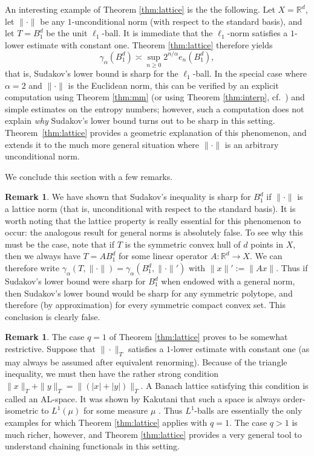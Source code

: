 \documentclass[10pt,reqno]{amsart}
\theoremstyle{definition}
\newtheorem{rem}[thm]{Remark}
\numberwithin{equation}{section}
\numberwithin{figure}{section}
\numberwithin{table}{section}
\begin{document}
An interesting example of Theorem \ref{thm:lattice} is the the following. 
Let $X=\mathbb{R}^d$, let $\|\cdot\|$ be any $1$-unconditional norm (with 
respect to the standard basis), and let $T=B_1^d$ be the unit 
$\ell_1$-ball. It is immediate that the $\ell_1$-norm satisfies a 
$1$-lower estimate with constant one. Theorem \ref{thm:lattice} therefore 
yields
$$
	\gamma_\alpha(B_1^d) \asymp
	\sup_{n\ge 0}2^{n/\alpha}e_n(B_1^d),
$$
that is, Sudakov's lower bound is sharp for the $\ell_1$-ball. In the 
special case where $\alpha=2$ and $\|\cdot\|$ is the Euclidean norm, this 
can be verified by an explicit computation using Theorem \ref{thm:mm}
(or using Theorem \ref{thm:interp}, cf.\ \cite[section 3.2]{vH16a}) 
and simple estimates on the entropy numbers; however, such a computation 
does not explain \emph{why} Sudakov's lower bound turns out to be sharp in 
this setting. Theorem~\ref{thm:lattice} provides a geometric explanation 
of this phenomenon, and extends it to the much more general situation 
where $\|\cdot\|$ is an arbitrary unconditional norm.

We conclude this section with a few remarks.

\begin{rem}
We have shown that Sudakov's inequality is sharp for $B_1^d$ if 
$\|\cdot\|$ is a lattice norm (that is, unconditional with respect to the 
standard basis). It is worth noting that the lattice property is really 
essential for this phenomenon to occur: the analogous result for general 
norms is absolutely false. To see why this must be the case, note that if 
$T$ is the symmetric convex hull of $d$ points in $X$, then we always have 
$T=AB_1^d$ for some linear operator $A:\mathbb{R}^d\to X$. We can 
therefore write $\gamma_\alpha(T,\|\cdot\|)= 
\gamma_\alpha(B_1^d,\|\cdot\|')$ with $\|x\|':=\|Ax\|$. Thus if Sudakov's 
lower bound were sharp for $B_1^d$ when endowed with a general norm, then 
Sudakov's lower bound would be sharp for any symmetric polytope, and 
therefore (by approximation) for every symmetric compact convex set. This 
conclusion is clearly false.
\end{rem}

\begin{rem}
The case $q=1$ of Theorem \ref{thm:lattice} proves to be somewhat 
restrictive. 
Suppose that $\|\cdot\|_T$ satisfies a $1$-lower estimate with constant 
one (as may always be assumed after equivalent renorming). Because of the 
triangle inequality, we must then have the rather strong condition 
$\|x\|_T+\|y\|_T = \|(|x|+|y|)\|_T$. A Banach lattice satisfying this 
condition is called an AL-space. It was shown by Kakutani that such a 
space is always order-isometric to $L^1(\mu)$ for some measure $\mu$ 
\cite[Theorem 1.b.2]{LT79}. Thus $L^1$-balls are 
essentially the only examples for which Theorem \ref{thm:lattice} applies 
with $q=1$. The case $q>1$ is much richer, however, and 
Theorem \ref{thm:lattice} provides a very general tool to understand 
chaining functionals in this setting.
\end{rem}
\end{document}
